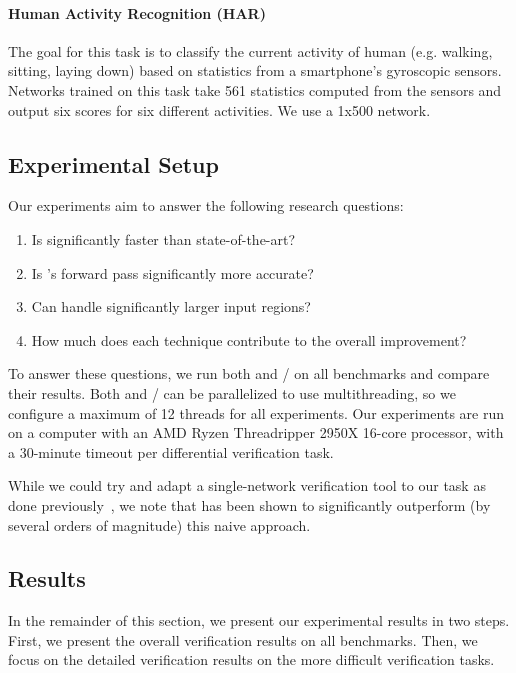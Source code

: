 \paragraph{Human Activity Recognition (HAR)~\cite{AnguitaHAR}}
The goal for this task is to classify
the current activity of human (e.g. walking, sitting, laying down) based
on statistics from a smartphone's gyroscopic sensors. Networks trained
on this task take 561 statistics computed from the sensors and output six
scores for six different activities. We use a 1x500 network.

\subsection{Experimental Setup}

Our experiments aim to answer the following research questions:

\begin{enumerate}
	\item Is \Name{} significantly faster than state-of-the-art?
	\item Is \Name{}'s forward pass significantly more accurate?
	\item Can \Name{} handle significantly larger input regions?
	\item How much does each technique contribute to the overall improvement?
\end{enumerate}

To answer these questions, we run both \Name{}
and \ReluDiff{}/\ReluDiffP{} on all benchmarks and compare their
results.  Both \Name{} and \ReluDiff{}/\ReluDiffP{} can be
parallelized to use multithreading, so we configure a maximum of 12
threads for all experiments.  Our experiments are run on a computer
with an AMD Ryzen Threadripper 2950X 16-core processor, with a
30-minute timeout per differential verification task.


While we could try and adapt a single-network verification tool to our
task as done previously~\cite{PaulsenWW20}, we note that \ReluDiff{}
has been shown to significantly outperform (by several orders of
magnitude) this naive approach.



\subsection{Results}

In the remainder of this section, we present our experimental results
in two steps.  First, we present the overall verification results on
all benchmarks. Then, we focus on the detailed verification results on
the more difficult verification tasks.


